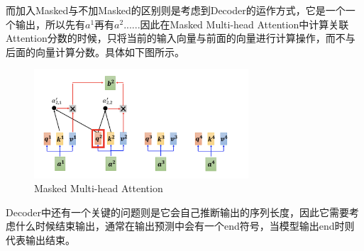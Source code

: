 \documentclass{article}
\begin{document}
\indent 而加入Masked与不加Masked的区别则是考虑到Decoder的运作方式，它是一个一个输出，所以先有\(a^{1}\)再有\(a^{2}\)......因此在Masked Multi-head Attention中计算关联Attention分数的时候，只将当前的输入向量与前面的向量进行计算操作，而不与后面的向量计算分数。具体如下图所示。\par
\begin{figure}[H]
    \centering
    \includegraphics[width=8cm]{picture/MaskedMulti-headAttention.png}
    \caption{Masked Multi-head Attention}
    \label{fig:galxy}
\end{figure}
\indent Decoder中还有一个关键的问题则是它会自己推断输出的序列长度，因此它需要考虑什么时候结束输出，通常在输出预测中会有一个end符号，当模型输出end时则代表输出结束。 \par
\end{document}
